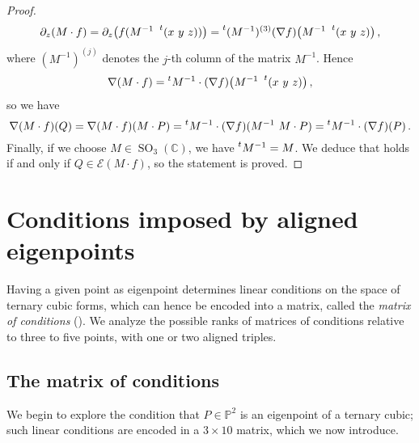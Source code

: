 \documentclass[a4paper, 11pt, reqno]{amsart}
\theoremstyle{plain}
\theoremstyle{definition}
\newcommand{\C}{\mathbb{C}}
\newcommand{\p}{\mathbb{P}}
\newcommand{\SO}{\operatorname{SO}}
\newcommand{\Eig}[1]{\mathcal{E}\!\left( {#1} \right)}
\begin{document}
\begin{proof}
\begin{gather*}
  \partial_z (M\cdot f) = \partial_z \bigl( f(M^{-1} \ \prescript{t} {} (x \ y \ z)) \bigr) = \prescript{t} {}(M^{-1})^{(3)}(\nabla f) \bigl( M^{-1}\ \prescript{t} {} (x \ y \ z) \bigr) \,,
\end{gather*}
%
where $(M^{-1})^{(j)}$ denotes the $j$-th column of the matrix $M^{-1}$. Hence
%
\[
  \nabla (M \cdot f) = \prescript{t} {} M^{-1} \cdot (\nabla f) \bigl(M^{-1}\ \prescript{t} {} (x \ y \ z)\bigr) \,,
\]
%
so we have
%
\[
  \nabla (M \cdot f)(Q)=\nabla (M \cdot f)(M \cdot P)=
  \prescript{t} {} M^{-1} \cdot (\nabla f) (M^{-1}\ M \cdot P)=\prescript{t} {} M^{-1} \cdot (\nabla f)(P) \,.
\]
%
Finally, if we choose $M \in \SO_3(\C)$, we have
$\prescript{t} {} M^{-1}=M$. We deduce that
 holds if and only if $Q \in \Eig{M\cdot f}$, so the statement is proved.
\end{proof}


\section{Conditions imposed by aligned eigenpoints}
\label{conditions}

Having a given point as eigenpoint determines linear conditions on the space of ternary cubic forms, 
which can hence be encoded into a matrix, called the \emph{matrix of conditions} (). 
We analyze the possible ranks of matrices of conditions relative to three to five points, with one or two aligned triples.

\subsection{The matrix of conditions}

We begin to explore the condition that $P\in \p^2$ is an eigenpoint of a ternary cubic; such linear conditions are encoded in
a $3 \times 10$ matrix, which we now introduce.
\end{document}
